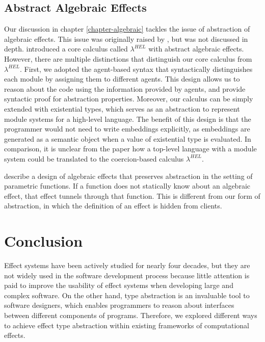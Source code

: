 \subsection{Abstract Algebraic Effects}
\label{related-abstract}
Our discussion in chapter \ref{chapter-algebraic} tackles the issue of abstraction of algebraic effects. This issue was originally raised by \citet{leijen18}, but was not discussed in depth. \citet{biernacki19} introduced a core calculus called $\lambda^{HEL}$ with abstract algebraic effects. However, there are multiple distinctions that distinguish our core calculus from $\lambda^{HEL}$. First, we adopted the agent-based syntax that syntactically distinguishes each module by assigning them to different agents. This design allows us to reason about the code using the information provided by agents, and provide syntactic proof for abstraction properties. Moreover, our calculus can be simply extended with existential types, which serves as an abstraction to represent module systems for a high-level language. The benefit of this design is that the programmer would not need to write embeddings explicitly, as embeddings are generated as a semantic object when a value of existential type is evaluated. In comparison, it is unclear from the paper \cite{biernacki19} how a top-level language with a module system could be translated to the coercion-based calculus $\lambda^{HEL}$.

\citet{Zhang19} describe a design of algebraic effects that preserves abstraction in the setting of parametric functions. If a function does not statically know about an algebraic effect, that effect tunnels through that function.  This is different from our form of abstraction, in which the definition of an effect is hidden from clients.


\section{Conclusion}

Effect systems have been actively studied for nearly four decades, but they are not widely used in the software development process because little attention is paid to improve the usability of effect systems when developing large and complex software. On the other hand, type abstraction is an invaluable tool to software designers, which enables programmers to reason about interfaces between different components of programs. Therefore, we explored different ways to achieve effect type abstraction within existing frameworks of computational effects.

